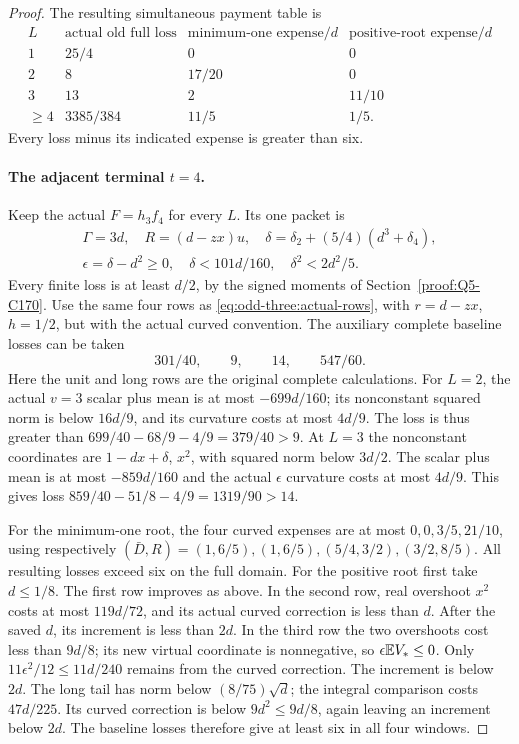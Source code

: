 \begin{proof}
The resulting simultaneous payment table is
\[
\begin{array}{c|c|c|c}
 L&\text{actual old full loss}&\text{minimum-one expense}/d
       &\text{positive-root expense}/d\\\hline
 1&25/4&0&0\\
 2&8&17/20&0\\
 3&13&2&11/10\\
 \ge4&3385/384&11/5&1/5.
\end{array}
\]
Every loss minus its indicated expense is greater than six.

\paragraph{The adjacent terminal $t=4$.}
Keep the actual $F=h_3f_4$ for every $L$. Its one packet is
\[
 \begin{gathered}
 \Gamma=3d,\quad R=(d-zx)u,\quad
 \delta=\delta_2+(5/4)(d^3+\delta_4),\\
 \epsilon=\delta-d^2\ge0,\quad
 \delta<101d/160,\quad\delta^2<2d^2/5.
 \end{gathered}
\]
Every finite loss is at least $d/2$, by the signed moments of
Section~\ref{proof:Q5-C170}. Use the same four rows as
\eqref{eq:odd-three:actual-rows}, with $r=d-zx$, $h=1/2$,
but with the actual curved convention.
The auxiliary complete baseline losses can be taken
\[
 301/40,\qquad9,\qquad14,\qquad547/60.
\]
Here the unit and long rows are the original complete calculations.
For $L=2$, the actual $v=3$ scalar plus mean is at most
$-699d/160$; its nonconstant squared norm is below $16d/9$,
and its curvature costs at most $4d/9$. The loss is thus greater
than $699/40-68/9-4/9=379/40>9$.
At $L=3$ the nonconstant coordinates are
$1-dx+\delta$, $x^2$, with squared norm below $3d/2$.
The scalar plus mean is at most $-859d/160$ and the actual
$\epsilon$ curvature costs at most $4d/9$. This gives loss
$859/40-51/8-4/9=1319/90>14$.

For the minimum-one root, the four curved expenses are at most
$0,0,3/5,21/10$, using respectively
$(\bar D,R)=(1,6/5),(1,6/5),(5/4,3/2),(3/2,8/5)$.
All resulting losses exceed six on the full domain.
For the positive root first take $d\le1/8$.
The first row improves as above. In the second row, real overshoot
$x^2$ costs at most $119d/72$, and its actual curved correction
is less than $d$. After the saved $d$, its increment is less than
$2d$. In the third row the two overshoots cost less than $9d/8$;
its new virtual coordinate is nonnegative, so $\epsilon\mathbb E V_*\le0$.
Only $11\epsilon^2/12\le11d/240$ remains from the curved correction.
The increment is below $2d$.
The long tail has norm below $(8/75)\sqrt d$; the integral
comparison costs $47d/225$. Its curved correction is below
$9d^2\le9d/8$, again leaving an increment below $2d$.
The baseline losses therefore give at least six in all four windows.


\end{proof}
